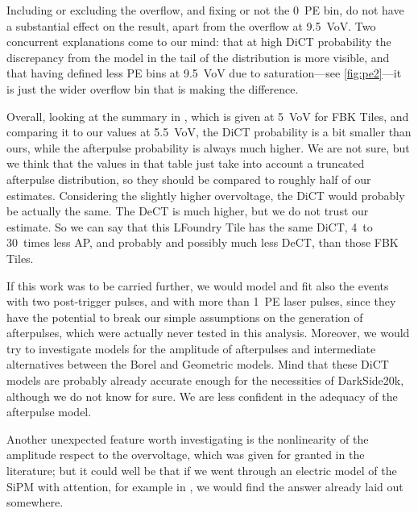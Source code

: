 Including or excluding the overflow, and fixing or not the 0~PE bin, do not
have a substantial effect on the result, apart from the overflow at
\SI{9.5}{VoV}. Two concurrent explanations come to our mind: that at high DiCT
probability the discrepancy from the model in the tail of the distribution is
more visible, and that having defined less PE bins at \SI{9.5}{VoV} due to
saturation---see \autoref{fig:pe2}---it is just the wider overflow bin that is
making the difference.

Overall, looking at the summary in \cite[tab.~3.1~p.~62]{savarese2018}, which
is given at \SI{5}{VoV} for FBK Tiles, and comparing it to our values at
\SI{5.5}{VoV}, the DiCT probability is a bit smaller than ours, while the
afterpulse probability is always much higher. We are not sure, but we think
that the values in that table just take into account a truncated afterpulse
distribution, so they should be compared to roughly half of our estimates.
Considering the slightly higher overvoltage, the DiCT would probably be
actually the same. The DeCT is much higher, but we do not trust our estimate.
So we can say that this LFoundry Tile has the same DiCT, 4~to 30~times less AP,
and probably and possibly much less DeCT, than those FBK Tiles.

If this work was to be carried further, we would model and fit also the events
with two post-trigger pulses, and with more than 1~PE laser pulses, since they
have the potential to break our simple assumptions on the generation of
afterpulses, which were actually never tested in this analysis. Moreover, we
would try to investigate models for the amplitude of afterpulses and
intermediate alternatives between the Borel and Geometric models. Mind that
these DiCT models are probably already accurate enough for the necessities of
DarkSide20k, although we do not know for sure. We are less confident in the
adequacy of the afterpulse model.


Another unexpected feature worth investigating is the nonlinearity of the
amplitude respect to the overvoltage, which was given for granted in the
literature; but it could well be that if we went through an electric model of
the SiPM with attention, for example in \cite[ch.~3]{savarese2018}, we would
find the answer already laid out somewhere.


